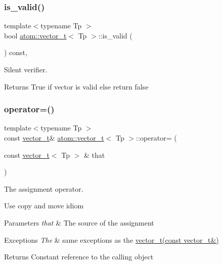 \subsubsection{\texorpdfstring{is\+\_\+valid()}{is\_valid()}}
{\footnotesize\ttfamily template$<$typename Tp $>$ \\
bool \hyperlink{classatom_1_1vector__t}{atom\+::vector\+\_\+t}$<$ Tp $>$\+::is\+\_\+valid (\begin{DoxyParamCaption}{ }\end{DoxyParamCaption}) const\hspace{0.3cm}{\ttfamily [inline]}, {\ttfamily [noexcept]}}



Silent verifier. 

\begin{DoxyReturn}{Returns}
True if vector is valid else return false 
\end{DoxyReturn}
\mbox{\label{classatom_1_1vector__t_af0b2037e8034d5bb97ac320f4513df2d}} 
\subsubsection{\texorpdfstring{operator=()}{operator=()}}
{\footnotesize\ttfamily template$<$typename Tp $>$ \\
const \hyperlink{classatom_1_1vector__t}{vector\+\_\+t}\& \hyperlink{classatom_1_1vector__t}{atom\+::vector\+\_\+t}$<$ Tp $>$\+::operator= (\begin{DoxyParamCaption}\item[{const \hyperlink{classatom_1_1vector__t}{vector\+\_\+t}$<$ Tp $>$ \&}]{that }\end{DoxyParamCaption})\hspace{0.3cm}{\ttfamily [inline]}}



The assignment operator. 

Use copy and move idiom 
\begin{DoxyParams}{Parameters}
{\em that} & The source of the assignment \\
\hline
\end{DoxyParams}

\begin{DoxyExceptions}{Exceptions}
{\em The} & same exceptions as the \hyperlink{classatom_1_1vector__t_a2c546a0310265fa1eabcc21ac4349d33}{vector\+\_\+t(const vector\+\_\+t\&)} \\
\hline
\end{DoxyExceptions}
\begin{DoxyReturn}{Returns}
Constant reference to the calling object 
\end{DoxyReturn}
\mbox{\label{classatom_1_1vector__t_aa8d100ece074c429aafe4cd110165643}} 
